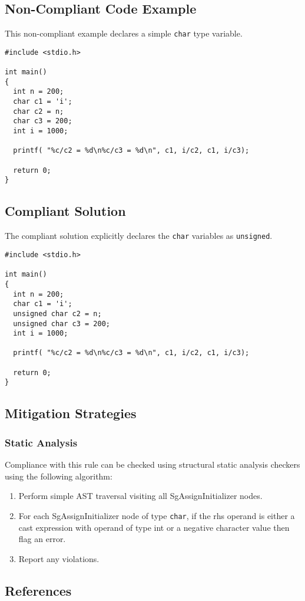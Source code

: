 \subsection{Non-Compliant Code Example}
This non-compliant example declares a simple {\tt char} type variable.

\begin{verbatim}
#include <stdio.h>

int main()
{
  int n = 200;
  char c1 = 'i';
  char c2 = n;
  char c3 = 200;
  int i = 1000;

  printf( "%c/c2 = %d\n%c/c3 = %d\n", c1, i/c2, c1, i/c3);

  return 0;
}
\end{verbatim}

\subsection{Compliant Solution}
The compliant solution explicitly declares the {\tt char} variables as {\tt unsigned}.

\begin{verbatim}
#include <stdio.h>

int main()
{
  int n = 200;
  char c1 = 'i';
  unsigned char c2 = n;
  unsigned char c3 = 200;
  int i = 1000;

  printf( "%c/c2 = %d\n%c/c3 = %d\n", c1, i/c2, c1, i/c3);

  return 0;
}
\end{verbatim}

\subsection{Mitigation Strategies}
\subsubsection{Static Analysis} 

Compliance with this rule can be checked using structural static analysis checkers using the following algorithm:

\begin{enumerate}
\item Perform simple AST traversal visiting all SgAssignInitializer nodes.
\item For each SgAssignInitializer node of type {\tt char}, if the rhs operand is either a cast expression with operand of type int or a negative character value then flag an error.
\item Report any violations. 
\end{enumerate}

\subsection{References}
